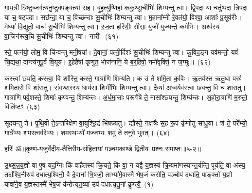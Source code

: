 {\anuvakamend[{प॒श्चादे॒ताः पु॒रो᳚\-ऽक्ष्ण॒या कल्प॒ते\-ऽसं॑ यतं॒ पञ्च॑त्रिꣳशच्च}]}%

गा॒य॒त्री त्रि॒ष्टुब्जग॑त्यनु॒ष्टुक्प॒ङ्क्त्या॑ स॒ह। बृ॒ह॒त्यु॑ष्णिहा॑ क॒कुथ्सू॒चीभिः॑ शिम्यन्तु त्वा। द्वि॒पदा॒ या चतु॑ष्पदा त्रि॒पदा॒ या च॒ षट्प॑दा। सछ॑न्दा॒ या च॒ विच्छ॑न्दाः सू॒चीभिः॑ शिम्यन्तु त्वा। म॒हाना᳚म्नी रे॒वत॑यो॒ विश्वा॒ आशाः᳚ प्र॒सूव॑रीः। मेघ्या॑ वि॒द्युतो॒ वाचः॑ सू॒चीभिः॑ शिम्यन्तु त्वा। र॒ज॒ता हरि॑णीः॒ सीसा॒ युजो॑ युज्यन्ते॒ कर्म॑भिः। अश्व॑स्य वा॒जिन॑स्त्व॒चि सू॒चीभिः॑ शिम्यन्तु त्वा। नारी᳚-~(६१)\ip

स्ते॒ पत्न॑यो॒ लोम॒ वि चि॑न्वन्तु मनी॒षया᳚। दे॒वानां॒ पत्नी॒र्दिशः॑ सू॒चीभिः॑ शिम्यन्तु त्वा। कु॒विद॒ङ्ग यव॑मन्तो॒ यवं॑ चि॒द्यथा॒ दान्त्य॑नुपू॒र्वं वि॒यूय॑। इ॒हेहै॑षां कृणुत॒ भोज॑नानि॒ ये ब॒र्॒\mbox{}हिषो॒ नमो॑वृक्तिं॒ न ज॒ग्मुः॥~(६२)\ip

{\anuvakamend[{नारी᳚स्त्रि॒ꣳ॒शच्च॑}]}%

कस्त्वा᳚ छ्यति॒ कस्त्वा॒ वि शा᳚स्ति॒ कस्ते॒ गात्रा॑णि शिम्यति। क उ॑ ते शमि॒ता क॒विः। ऋ॒तव॑स्त ऋतु॒धा परुः॑ शमि॒तारो॒ वि शा॑सतु। सं॒व॒थ्स॒रस्य॒ धाय॑सा॒ शिमी॑भिः शिम्यन्तु त्वा। दैव्या॑ अध्व॒र्यव॑स्त्वा॒ छ्यन्तु॒ वि च॑ शासतु। गात्रा॑णि पर्व॒शस्ते॒ शिमाः᳚ कृण्वन्तु॒ शिम्य॑न्तः। अ॒र्ध॒मा॒साः परूꣳ॑षि ते॒ मासा᳚श्छ्यन्तु॒ शिम्य॑न्तः। अ॒हो॒रा॒त्राणि॑ म॒रुतो॒ विलि॑ष्टꣳ~(६३)\ip

सूदयन्तु ते। पृ॒थि॒वी ते॒\-ऽन्तरि॑क्षेण वा॒युश्छि॒द्रं भि॑षज्यतु। द्यौस्ते॒ नक्ष॑त्रैः स॒ह रू॒पं कृ॑णोतु साधु॒या। शं ते॒ परे᳚भ्यो॒ गात्रे᳚भ्यः॒ शम॒स्त्वव॑रेभ्यः। शम॒स्थभ्यो॑ म॒ज्जभ्यः॒ शमु॑ ते त॒नुवे॑ भुवत्॥~(६४)\ip

{\anuvakamend[{विलि॑ष्टन्त्रि॒ꣳ॒शच्च॑}]}%

{हरिः॑ ॐ}{॥कृष्ण-यजुर्वेदीय-तैत्तिरीय-संहितायां पञ्चमकाण्डे द्वितीयः प्रश्नः समाप्तः॥५-२॥}



\setcounter{anuvakam}{0}
उ॒थ्स॒न्न॒य॒ज्ञो वा ए॒ष यद॒ग्निः किं वाहै॒तस्य॑ क्रि॒यते॒ किं वा॒ न यद्वै य॒ज्ञस्य॑ क्रि॒यमा॑णस्यान्त॒र्यन्ति॒ पूय॑ति॒ वा अ॑स्य॒ तदा᳚श्वि॒नीरुप॑ दधात्य॒श्विनौ॒ वै दे॒वानां᳚ भि॒षजौ॒ ताभ्या॑मे॒वास्मै॑ भेष॒जं क॑रोति॒ पञ्चोप॑ दधाति॒ पाङ्क्तो॑ य॒ज्ञो यावा॑ने॒व य॒ज्ञस्तस्मै॑ भेष॒जं क॑रोत्यृत॒व्या॑ उप॑ दधात्यृतू॒नां कॢप्त्यै॒~(१)\ip

